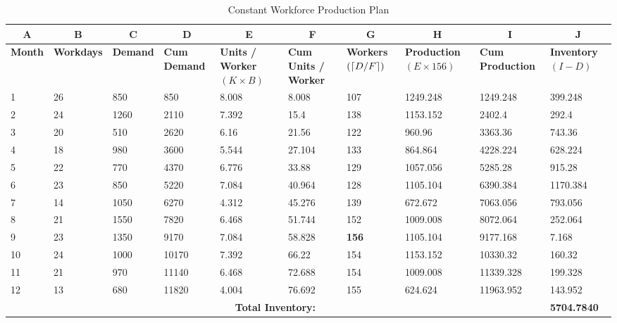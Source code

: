 \documentclass[12pt]{article}
\begin{document}
\begin{table}[H]
    \centering
    \begin{adjustbox}{width=\textwidth}
    \begin{tabular}{|l||l|l|p{1.8cm}|p{1.8cm}|p{1.8cm}|p{1.8cm}|p{2.2cm}|p{2cm}|p{1.9cm}|}
    \hline 
    \multicolumn{1}{|c||}{\textbf{A}} & \multicolumn{1}{c}{\textbf{B}}& \multicolumn{1}{|c}{\textbf{C}}& \multicolumn{1}{|c}{\textbf{D}}& \multicolumn{1}{|c}{\textbf{E}}& \multicolumn{1}{|c}{\textbf{F}}& \multicolumn{1}{|c}{\textbf{G}}& \multicolumn{1}{|c}{\textbf{H}}& \multicolumn{1}{|c}{\textbf{I}}& \multicolumn{1}{|c|}{\textbf{J}}
        \\ \hline \hline 
        \textbf{Month} & \textbf{Workdays} & \textbf{Demand} & \textbf{Cum Demand} & \textbf{Units / Worker $(K \times B)$} & \textbf{Cum Units / Worker} & \textbf{Workers $(\lceil D / F\rceil)$} & \textbf{Production} $(E \times 156)$ & \textbf{Cum Production} & \textbf{Inventory $(I-D)$} \\ \hline \hline 
        1 & 26 & 850 & 850 & 8.008 & 8.008 & 107 & 1249.248 & 1249.248 & 399.248 \\ \hline
        2 & 24 & 1260 & 2110 & 7.392 & 15.4 & 138 & 1153.152 & 2402.4 & 292.4 \\ \hline
        3 & 20 & 510 & 2620 & 6.16 & 21.56 & 122 & 960.96 & 3363.36 & 743.36 \\ \hline
        4 & 18 & 980 & 3600 & 5.544 & 27.104 & 133 & 864.864 & 4228.224 & 628.224 \\ \hline
        5 & 22 & 770 & 4370 & 6.776 & 33.88 & 129 & 1057.056 & 5285.28 & 915.28 \\ \hline
        6 & 23 & 850 & 5220 & 7.084 & 40.964 & 128 & 1105.104 & 6390.384 & 1170.384 \\ \hline
        7 & 14 & 1050 & 6270 & 4.312 & 45.276 & 139 & 672.672 & 7063.056 & 793.056 \\ \hline
        8 & 21 & 1550 & 7820 & 6.468 & 51.744 & 152 & 1009.008 & 8072.064 & 252.064 \\ \hline
        9 & 23 & 1350 & 9170 & 7.084 & 58.828 & \textbf{156} & 1105.104 & 9177.168 & 7.168 \\ \hline
        10 & 24 & 1000 & 10170 & 7.392 & 66.22 & 154 & 1153.152 & 10330.32 & 160.32 \\ \hline
        11 & 21 & 970 & 11140 & 6.468 & 72.688 & 154 & 1009.008 & 11339.328 & 199.328 \\ \hline
        12 & 13 & 680 & 11820 & 4.004 & 76.692 & 155 & 624.624 & 11963.952 & 143.952 \\ \hline
        \multicolumn{9}{|c|}{\textbf{Total Inventory:}} & \textbf{5704.7840} \\ \hline 
    \end{tabular}
    \end{adjustbox}
    \caption{Constant Workforce Production Plan}
    \label{tab1:constwork}
\end{table} 
\end{document}
